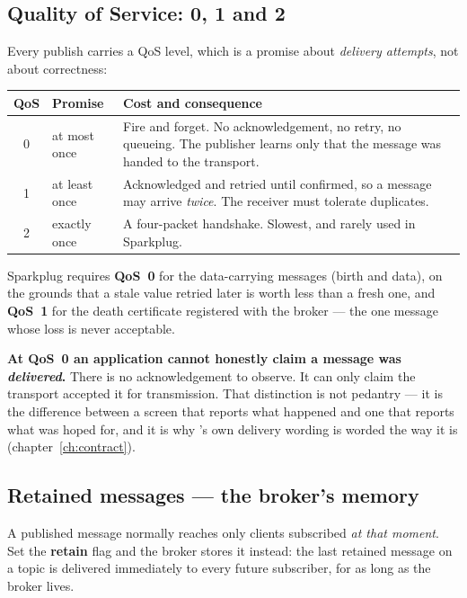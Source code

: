 \subsection{Quality of Service: 0, 1 and 2}

Every publish carries a QoS level, which is a promise about \emph{delivery attempts}, not
about correctness:

\begin{center}
\begin{tabular}{@{}c l p{8.2cm}@{}}
\toprule
\textbf{QoS} & \textbf{Promise} & \textbf{Cost and consequence} \\
\midrule
0 & at most once  & Fire and forget. No acknowledgement, no retry, no queueing. The
                    publisher learns only that the message was handed to the transport. \\
1 & at least once & Acknowledged and retried until confirmed, so a message may arrive
                    \emph{twice}. The receiver must tolerate duplicates. \\
2 & exactly once  & A four-packet handshake. Slowest, and rarely used in Sparkplug. \\
\bottomrule
\end{tabular}
\end{center}

Sparkplug requires \textbf{QoS~0} for the data-carrying messages (birth and data), on the
grounds that a stale value retried later is worth less than a fresh one, and \textbf{QoS~1}
for the death certificate registered with the broker --- the one message whose loss is
never acceptable.

\begin{warning}
\textbf{At QoS~0 an application cannot honestly claim a message was \emph{delivered}.}
There is no acknowledgement to observe. It can only claim the transport accepted it for
transmission. That distinction is not pedantry --- it is the difference between a screen
that reports what happened and one that reports what was hoped for, and it is why
\prog's own delivery wording is worded the way it is (chapter~\ref{ch:contract}).
\end{warning}

\subsection{Retained messages --- the broker's memory}

A published message normally reaches only clients subscribed \emph{at that moment}. Set
the \textbf{retain} flag and the broker stores it instead: the last retained message on a
topic is delivered immediately to every future subscriber, for as long as the broker
lives.


